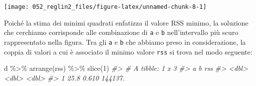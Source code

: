 \documentclass[
  10pt,
  italian,
  a4paper,
  extrafontsizes,onecolumn,openright
  ]{memoir}
\newenvironment{Shaded}{\begin{snugshade}}{\end{snugshade}}
\newcommand{\AttributeTok}[1]{\textcolor[rgb]{0.77,0.63,0.00}{#1}}
\newcommand{\CommentTok}[1]{\textcolor[rgb]{0.56,0.35,0.01}{\textit{#1}}}
\newcommand{\DecValTok}[1]{\textcolor[rgb]{0.00,0.00,0.81}{#1}}
\newcommand{\FloatTok}[1]{\textcolor[rgb]{0.00,0.00,0.81}{#1}}
\newcommand{\FunctionTok}[1]{\textcolor[rgb]{0.00,0.00,0.00}{#1}}
\newcommand{\NormalTok}[1]{#1}
\newcommand{\OtherTok}[1]{\textcolor[rgb]{0.56,0.35,0.01}{#1}}
\newcommand{\SpecialCharTok}[1]{\textcolor[rgb]{0.00,0.00,0.00}{#1}}
\newcommand{\StringTok}[1]{\textcolor[rgb]{0.31,0.60,0.02}{#1}}
\begin{document}
\begin{Shaded}
\end{Shaded}

\begin{center}\texttt{[image: 052\_reglin2\_files/figure-latex/unnamed-chunk-8-1]} \end{center}

Poiché la stima dei minimi quadrati enfatizza il valore RSS minimo, la soluzione che cerchiamo corrisponde alle combinazione di \texttt{a} e \texttt{b} nell'intervallo più scuro rappresentato nella figura. Tra gli \texttt{a} e \texttt{b} che abbiamo preso in considerazione, la coppia di valori a cui è associato il minimo valore \texttt{rss} si trova nel modo seguente:

\begin{Shaded}
\begin{Highlighting}[]
\NormalTok{d }\SpecialCharTok{\%\textgreater{}\%} 
  \FunctionTok{arrange}\NormalTok{(rss) }\SpecialCharTok{\%\textgreater{}\%} 
  \FunctionTok{slice}\NormalTok{(}\DecValTok{1}\NormalTok{)}
\CommentTok{\#\textgreater{} \# A tibble: 1 x 3}
\CommentTok{\#\textgreater{}       a     b     rss}
\CommentTok{\#\textgreater{}   \textless{}dbl\textgreater{} \textless{}dbl\textgreater{}   \textless{}dbl\textgreater{}}
\CommentTok{\#\textgreater{} 1  25.8 0.610 144137.}
\end{Highlighting}
\end{Shaded}
\end{document}
